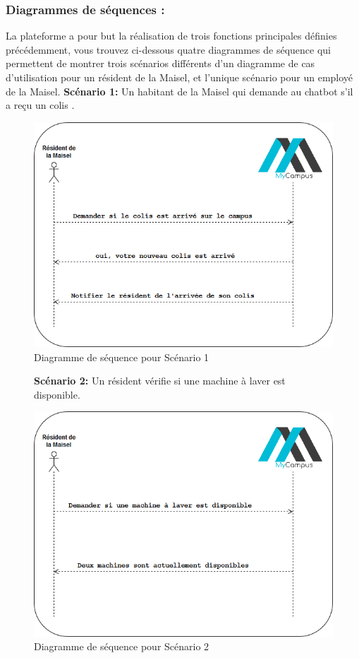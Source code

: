 \documentclass[12pt]{report}
\begin{document}
\newpage

\subsubsection{Diagrammes de séquences :}
La plateforme a pour but la réalisation de trois fonctions principales définies précédemment, vous trouvez ci-dessous quatre diagrammes de séquence qui permettent de montrer trois scénarios différents d’un diagramme de cas d’utilisation pour un résident de la Maisel, et l’unique scénario pour un employé de la Maisel.
\bigbreak
\textbf{Scénario 1:}  Un habitant de la Maisel qui demande au chatbot s'il a reçu un colis .
\begin{figure}[h!]
\begin{center}
\includegraphics[scale=0.45]{colis.png}
\caption{Diagramme de séquence pour Scénario 1}
\end{center}
\end{figure}


\begin{figure}[h!]
\textbf{Scénario 2:}  Un résident vérifie si une machine à laver est disponible.
\begin{center}
\includegraphics[scale=0.45]{machine.png}
\caption{Diagramme de séquence pour Scénario 2}
\end{center}
\end{figure}
\end{document}
